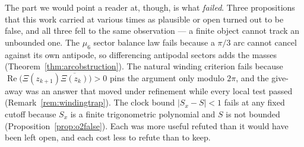 \documentclass[11pt]{article}
\theoremstyle{plain}
\theoremstyle{definition}
\theoremstyle{remark}
\begin{document}
The part we would point a reader at, though, is what \emph{failed}. Three propositions
that this work carried at various times as plausible or open turned out to be false,
and all three fell to the same observation --- a finite object cannot track an unbounded
one. The $\mu_6$ sector balance law fails because a $\pi/3$ arc cannot cancel against
its own antipode, so differencing antipodal sectors adds the masses
(Theorem~\ref{thm:arcobstruction}). The natural winding criterion fails because
$\operatorname{Re}\bigl(\Xi(z_{k+1})\overline{\Xi(z_k)}\bigr)>0$ pins the argument only
modulo $2\pi$, and the give-away was an answer that moved under refinement while every
local test passed (Remark~\ref{rem:windingtrap}). The clock bound
$\lvert S_x-S\rvert<1$ fails at any fixed cutoff because $S_x$ is a finite
trigonometric polynomial and $S$ is not bounded
(Proposition~\ref{prop:o2false}). Each was more useful refuted than it would have been
left open, and each cost less to refute than to keep.
\end{document}
